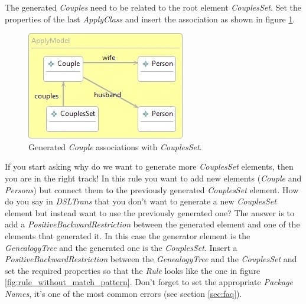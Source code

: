 The generated \emph{Couples} need to be related to the root element
\emph{CouplesSet}. Set the properties of the last \emph{ApplyClass} and insert
the association as shown in figure \ref{fig:couple_relations_2}.

\begin{figure}[h]
\begin{center}
  \includegraphics[scale=0.7]{imgs/couple_relations_2.jpg}
  \caption{Generated \emph{Couple} associations with \emph{CouplesSet}.}
  \label{fig:couple_relations_2}
\end{center}
\end{figure}

If you start asking why do we want to generate more \emph{CouplesSet} elements,
then you are in the right track! In this rule you want to add new elements
(\emph{Couple} and \emph{Persons}) but connect them to the previously
generated \emph{CouplesSet} element. How do you say in \emph{DSLTrans} that you
don't want to generate a new \emph{CouplesSet} element but instead want to
use the previously generated one? The answer is to add a
\emph{PositiveBackwardRestriction} between the generated element and one of the
elements that generated it. In this case the generator element is the
\emph{GenealogyTree} and the generated one is the \emph{CouplesSet}. Insert a
\emph{PositiveBackwardRestriction} between the \emph{GenealogyTree} and the
\emph{CouplesSet} and set the required properties so that the \emph{Rule} looks
like the one in figure \ref{fig:rule_without_match_pattern}. Don't forget to set
the appropriate \emph{Package Names}, it's one of the most common errors (see
section \ref{sec:faq}).

